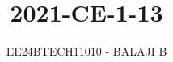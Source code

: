 \documentclass[journal]{IEEEtran}
\begin{document}

\vspace{3cm}

\title{2021-CE-1-13}
\author{EE24BTECH11010 - BALAJI B}
{\let\newpage\relax\maketitle}

\renewcommand{\thefigure}{\theenumi}
\renewcommand{\thetable}{\theenumi}
\setlength{\intextsep}{10pt} %


\renewcommand{\thetable}{\theenumi}
\end{document}
